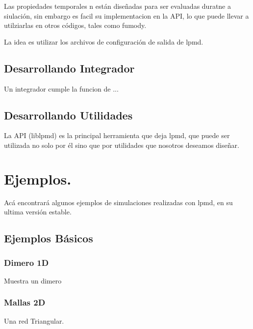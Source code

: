 \documentclass[a4paper,10pt]{scrbook}
\begin{document}
Las propiedades temporales n est\'an dise\~nadas para ser evaluadas duratne a siulaci\'on, sin embargo es facil su implementacion en la API, lo que puede llevar a utilziarlas en otros c\'odigos, tales como fumody.

La idea es utilizar los archivos de configuraci\'on de salida de lpmd.

\section{Desarrollando Integrador}

Un integrador cumple la funcion de ...

\section{Desarrollando Utilidades}

La API (liblpmd) es la principal herramienta que deja lpmd, que puede ser utilizada no solo por \'el sino que por utilidades que nosotros deseamos dise\~nar.

\chapter{Ejemplos.}
\label{chap:exa}

Ac\'a encontrar\'a algunos ejemplos de simulaciones realizadas con lpmd, en su ultima versi\'on estable.

\section{Ejemplos B\'asicos}

\subsection{Dimero 1D}
Muestra un dimero 

\subsection{Mallas 2D}
Una red Triangular.
\end{document}
